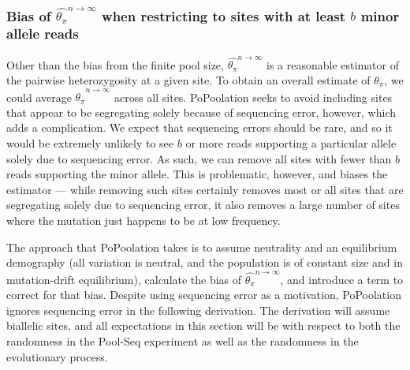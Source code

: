 \documentclass[a4paper,fontsize=9pt,DIV=14]{scrartcl}
\newcounter{todo}
\newcounter{popoolissue}
\newcommand\todo[1]{}
\newcommand\popoolissue[1]{}
\newcommand{\samplesize}{n}
\newcommand{\thetapi}{\widehat{\theta_\pi}}
\begin{document}
\popoolissue{We think that it is makes sense to compute only on biallelic SNPs, as this is a theoretical derivation of $4N_e\mu$, which assumes the infinitesimal model (which does not allow for multi-allelic loci). Still, we briefly wanted to check in with you here. Our guess is that the computation in code is just done for all four nucleotides to keep the code simple -- but the function only gets called for biallelic sites, so it behaves as if it was only computed for biallelic SNPs. Is that right?}



\subsubsection*{Bias of $\thetapi^{\samplesize\to\infty}$ when restricting to sites with at least $b$ minor allele reads}
\label{supp:sec:ThetaPi:sub:PoolSequencing:sub:ExpectedValue}

Other than the bias from the finite pool size, $\thetapi^{\samplesize\to\infty}$ is a reasonable estimator of the pairwise heterozygosity at a given site.  To obtain an overall estimate of $\theta_\pi$, we could average $\thetapi^{\samplesize\to\infty}$ across all sites.  PoPoolation seeks to avoid including sites that appear to be segregating solely because of sequencing error, however, which adds a complication.  We expect that sequencing errors should be rare, and so it would be extremely unlikely to see $b$ or more reads supporting a particular allele solely due to sequencing error.  As such, we can remove all sites with fewer than $b$ reads supporting the minor allele.  This is problematic, however, and biases the estimator --- while removing such sites certainly removes most or all sites that are segregating solely due to sequencing error, it also removes a large number of sites where the mutation just happens to be at low frequency.

The approach that PoPoolation takes is to assume neutrality and an equilibrium demography (all variation is neutral, and the population is of constant size and in mutation-drift equilibrium), calculate the bias of $\thetapi^{\samplesize\to\infty}$, and introduce a term to correct for that bias.  Despite using sequencing error as a motivation, PoPoolation ignores sequencing error in the following derivation.  The derivation will assume biallelic sites, and all expectations in this section will be with respect to both the randomness in the Pool-Seq experiment as well as the randomness in the evolutionary process.  
\end{document}
